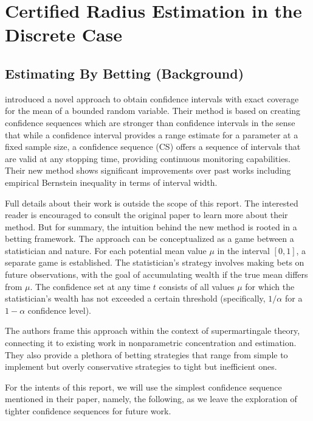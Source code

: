 \section{Certified Radius Estimation in the Discrete Case}\label{sec:continuous}

\subsection{Estimating By Betting (Background)}\label{subsec:estimating-by-betting}
\cite{smith2022estimating} introduced a novel approach to obtain confidence intervals with exact coverage for the mean of a bounded random variable.
Their method is based on creating confidence sequences which are stronger than confidence intervals in the sense that while a confidence interval provides a range estimate for a parameter at a fixed sample size, a confidence sequence (CS) offers a sequence of intervals that are valid at any stopping time, providing continuous monitoring capabilities.
Their new method shows significant improvements over past works including empirical Bernstein inequality in terms of interval width.

Full details about their work is outside the scope of this report.
The interested reader is encouraged to consult the original paper to learn more about their method.
But for summary, the intuition behind the new method is rooted in a betting framework.
The approach can be conceptualized as a game between a statistician and nature.
For each potential mean value $\mu$ in the interval $[0,1]$, a separate game is established.
The statistician's strategy involves making bets on future observations, with the goal of accumulating wealth if the true mean differs from $\mu$.
The confidence set at any time $t$ consists of all values $\mu$ for which the statistician's wealth has not exceeded a certain threshold (specifically, $1/\alpha$ for a $1-\alpha$ confidence level).

The authors frame this approach within the context of supermartingale theory, connecting it to existing work in nonparametric concentration and estimation.
They also provide a plethora of betting strategies that range from simple to implement but overly conservative strategies to tight but inefficient ones.

For the intents of this report, we will use the simplest confidence sequence mentioned in their paper, namely, the following, as we leave the exploration of tighter confidence sequences for future work.

